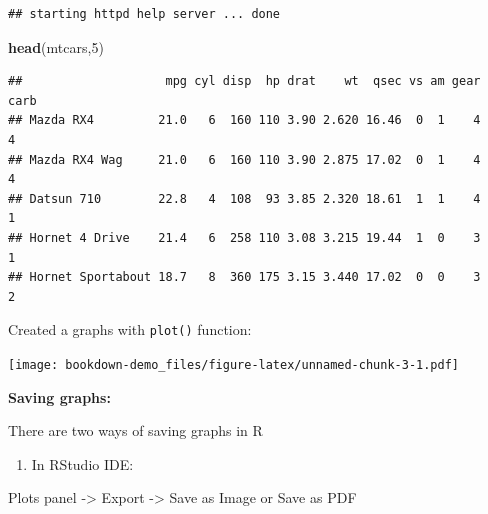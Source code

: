 \documentclass[]{book}
\newenvironment{Shaded}{\begin{snugshade}}{\end{snugshade}}
\newcommand{\KeywordTok}[1]{\textcolor[rgb]{0.13,0.29,0.53}{\textbf{#1}}}
\newcommand{\DataTypeTok}[1]{\textcolor[rgb]{0.13,0.29,0.53}{#1}}
\newcommand{\DecValTok}[1]{\textcolor[rgb]{0.00,0.00,0.81}{#1}}
\newcommand{\StringTok}[1]{\textcolor[rgb]{0.31,0.60,0.02}{#1}}
\newcommand{\OtherTok}[1]{\textcolor[rgb]{0.56,0.35,0.01}{#1}}
\newcommand{\OperatorTok}[1]{\textcolor[rgb]{0.81,0.36,0.00}{\textbf{#1}}}
\newcommand{\NormalTok}[1]{#1}
\providecommand{\tightlist}{%
  \setlength{\itemsep}{0pt}\setlength{\parskip}{0pt}}
\begin{document}
\begin{verbatim}
## starting httpd help server ... done
\end{verbatim}

\begin{Shaded}
\begin{Highlighting}[]
\KeywordTok{head}\NormalTok{(mtcars,}\DecValTok{5}\NormalTok{)}
\end{Highlighting}
\end{Shaded}

\begin{verbatim}
##                    mpg cyl disp  hp drat    wt  qsec vs am gear carb
## Mazda RX4         21.0   6  160 110 3.90 2.620 16.46  0  1    4    4
## Mazda RX4 Wag     21.0   6  160 110 3.90 2.875 17.02  0  1    4    4
## Datsun 710        22.8   4  108  93 3.85 2.320 18.61  1  1    4    1
## Hornet 4 Drive    21.4   6  258 110 3.08 3.215 19.44  1  0    3    1
## Hornet Sportabout 18.7   8  360 175 3.15 3.440 17.02  0  0    3    2
\end{verbatim}

Created a graphs with \texttt{plot()} function:

\begin{Shaded}
\end{Shaded}

\texttt{[image: bookdown-demo\_files/figure-latex/unnamed-chunk-3-1.pdf]}

\textbf{Saving graphs: }

There are two ways of saving graphs in R

\begin{enumerate}
\def\labelenumi{\arabic{enumi}.}
\tightlist
\item
  In RStudio IDE:
\end{enumerate}

Plots panel -\textgreater{} Export -\textgreater{} Save as Image or Save
as PDF
\end{document}
